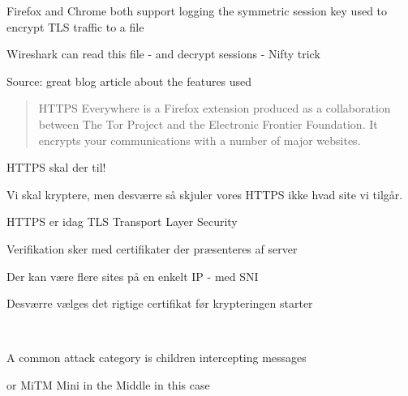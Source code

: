 \documentclass[Screen16to9,17pt]{foils}
\begin{document}

\begin{list1}
\item  Firefox and Chrome both support logging the symmetric session key used to encrypt TLS traffic to a file
\item Wireshark can read this file - and decrypt sessions - Nifty trick
\end{list1}


Source: great blog article about the features used\\
{\tiny{}}




\begin{quote}
HTTPS Everywhere is a Firefox extension produced as a collaboration between The Tor Project and the Electronic Frontier Foundation. It encrypts your communications with a number of major websites.
\end{quote}

\centerline{}


HTTPS skal der til!



Vi skal kryptere, men desværre så skjuler vores HTTPS ikke hvad site vi tilgår.

\begin{list2}
\item HTTPS er idag TLS Transport Layer Security
\item Verifikation sker med certifikater der præsenteres af server
\item Der kan være flere sites på en enkelt IP - med SNI
\item Desværre vælges det rigtige certifikat før krypteringen starter
\end{list2}






{~}

\begin{list2}
\item A common attack category is children intercepting messages
\item or MiTM Mini in the Middle in this case
\end{list2}
\end{document}
